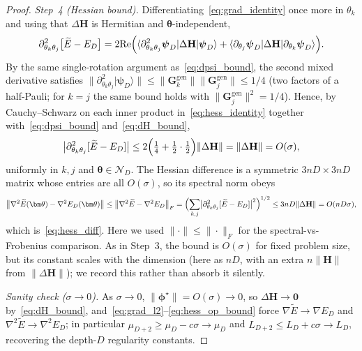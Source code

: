 \documentclass[11pt]{article}
\newcommand{\cN}{\mathcal{N}}
\theoremstyle{plain}
\theoremstyle{plain}
\begin{document}
\begin{proof}
\emph{Step~4 (Hessian bound).}
Differentiating~\eqref{eq:grad_identity} once more in $\theta_k$ and
using that $\Delta\mathbf{H}$ is Hermitian and $\bm\theta$-independent,
\begin{equation}\label{eq:hess_identity}
  \partial^2_{\theta_k\theta_j}\bigl[\widetilde{E}-E_D\bigr]
  =2 \mathrm{Re}\Bigl(
     \langle\partial^2_{\theta_k\theta_j}\boldsymbol{\psi}_D|\Delta\mathbf{H}|\boldsymbol{\psi}_D\rangle
     +\langle\partial_{\theta_j}\boldsymbol{\psi}_D|
        \Delta\mathbf{H}|\partial_{\theta_k}\boldsymbol{\psi}_D\rangle\Bigr).
\end{equation}
By the same single-rotation argument as~\eqref{eq:dpsi_bound}, the
second mixed derivative satisfies
$\|\partial^2_{\theta_k\theta_j}|\boldsymbol{\psi}_D\rangle\|
\le\|\mathbf{G}_k^{\mathrm{gen}}\| \|\mathbf{G}_j^{\mathrm{gen}}\|\le 1/4$
(two factors of a half-Pauli; for $k=j$ the same bound holds with
$\|\mathbf{G}_j^{\mathrm{gen}}\|^2=1/4$).  Hence, by Cauchy--Schwarz on each
inner product in~\eqref{eq:hess_identity} together
with~\eqref{eq:dpsi_bound} and~\eqref{eq:dH_bound},
\begin{equation}\label{eq:hess_comp_bound}
  \bigl|\partial^2_{\theta_k\theta_j}[\widetilde{E}-E_D]\bigr|
  \le 2\Bigl(\tfrac14+\tfrac12\cdot\tfrac12\Bigr)\|\Delta\mathbf{H}\|
  =\|\Delta\mathbf{H}\|=O(\sigma),
\end{equation}
uniformly in $k,j$ and $\bm\theta\in\cN_D$.  The Hessian difference is
a symmetric $3nD\times 3nD$ matrix whose entries are all $O(\sigma)$,
so its spectral norm obeys
\begin{equation}\label{eq:hess_op_bound}
  \bigl\|\nabla^2\widetilde{E}(\bm\theta)-\nabla^2 E_D(\bm\theta)\bigr\|
  \le\bigl\|\nabla^2\widetilde{E}-\nabla^2 E_D\bigr\|_F
  =\Bigl(\sum_{k,j}\bigl|\partial^2_{\theta_k\theta_j}[\widetilde{E}-E_D]\bigr|^2
   \Bigr)^{1/2}
  \le 3nD \|\Delta\mathbf{H}\|=O(nD \sigma),
\end{equation}
which is~\eqref{eq:hess_diff}.  Here we used $\|\cdot\|\le\|\cdot\|_F$
for the spectral-vs-Frobenius comparison.  As in Step~3, the bound is
$O(\sigma)$ for fixed problem size, but its constant scales with the
dimension (here as $nD$, with an extra $n\|\mathbf{H}\|$ from
$\|\Delta\mathbf{H}\|$); we record this rather than absorb it silently.

\emph{Sanity check ($\sigma\to0$).}
As $\sigma\to0$, $\|\bm\phi^\star\|=O(\sigma)\to0$, so $\Delta\mathbf{H}\to\mathbf{0}$
by~\eqref{eq:dH_bound}, and~\eqref{eq:grad_l2}--\eqref{eq:hess_op_bound}
force $\nabla\widetilde{E}\to\nabla E_D$ and
$\nabla^2\widetilde{E}\to\nabla^2 E_D$; in particular
$\mu_{D+2}\ge\mu_D-c\sigma\to\mu_D$ and $L_{D+2}\le L_D+c\sigma\to L_D$,
recovering the depth-$D$ regularity constants.
\end{proof}
\end{document}
